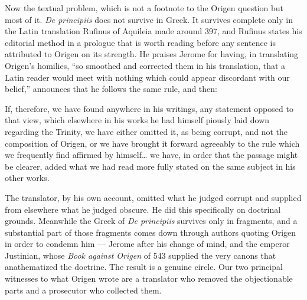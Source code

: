 Now the textual problem, which is not a footnote to the Origen question but most of it. \emph{De principiis} does not survive in Greek. It survives complete only in the Latin translation Rufinus of Aquileia made around 397, and Rufinus states his editorial method in a prologue that is worth reading before any sentence is attributed to Origen on its strength. He praises Jerome for having, in translating Origen's homilies, ``so smoothed and corrected them in his translation, that a Latin reader would meet with nothing which could appear discordant with our belief,'' announces that he follows the same rule, and then:

\begin{studyframe}
If, therefore, we have found anywhere in his writings, any statement opposed to that view, which elsewhere in his works he had himself piously laid down regarding the Trinity, we have either omitted it, as being corrupt, and not the composition of Origen, or we have brought it forward agreeably to the rule which we frequently find affirmed by himself\ldots{} we have, in order that the passage might be clearer, added what we had read more fully stated on the same subject in his other works.
\end{studyframe}

The translator, by his own account, omitted what he judged corrupt and supplied from elsewhere what he judged obscure. He did this specifically on doctrinal grounds. Meanwhile the Greek of \emph{De principiis} survives only in fragments, and a substantial part of those fragments comes down through authors quoting Origen in order to condemn him --- Jerome after his change of mind, and the emperor Justinian, whose \emph{Book against Origen} of 543 supplied the very canons that anathematized the doctrine. The result is a genuine circle. Our two principal witnesses to what Origen wrote are a translator who removed the objectionable parts and a prosecutor who collected them.

